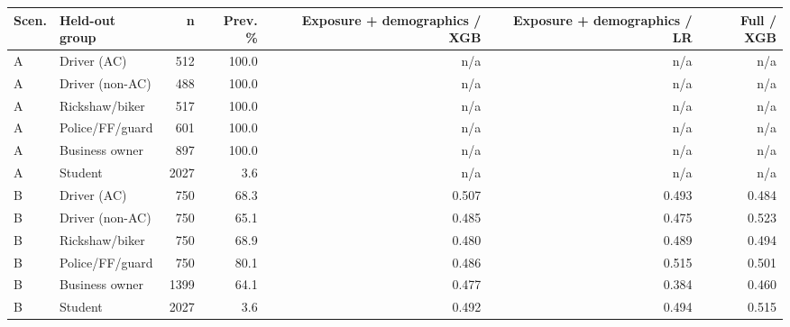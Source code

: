 \begin{tabular}{llrrrrr}
\toprule
Scen. & Held-out group & n & Prev. \% & Exposure + demographics / XGB & Exposure + demographics / LR & Full / XGB \\
\midrule
A & Driver (AC) & 512 & 100.0 & n/a & n/a & n/a \\
A & Driver (non-AC) & 488 & 100.0 & n/a & n/a & n/a \\
A & Rickshaw/biker & 517 & 100.0 & n/a & n/a & n/a \\
A & Police/FF/guard & 601 & 100.0 & n/a & n/a & n/a \\
A & Business owner & 897 & 100.0 & n/a & n/a & n/a \\
A & Student & 2027 & 3.6 & n/a & n/a & n/a \\
\midrule
B & Driver (AC) & 750 & 68.3 & 0.507 & 0.493 & 0.484 \\
B & Driver (non-AC) & 750 & 65.1 & 0.485 & 0.475 & 0.523 \\
B & Rickshaw/biker & 750 & 68.9 & 0.480 & 0.489 & 0.494 \\
B & Police/FF/guard & 750 & 80.1 & 0.486 & 0.515 & 0.501 \\
B & Business owner & 1399 & 64.1 & 0.477 & 0.384 & 0.460 \\
B & Student & 2027 & 3.6 & 0.492 & 0.494 & 0.515 \\
\bottomrule
\end{tabular}
